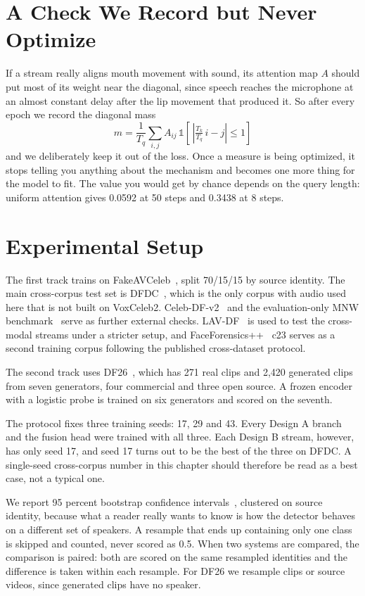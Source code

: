 \section{A Check We Record but Never Optimize}

If a stream really aligns mouth movement with sound, its attention map $A$
should put most of its weight near the diagonal, since speech reaches the
microphone at an almost constant delay after the lip movement that produced it.
So after every epoch we record the diagonal mass
\begin{equation}
m = \frac{1}{T_q}\sum_{i,j} A_{ij}\,\mathbb{1}\!\left[\,\left|\tfrac{T_k}{T_q}\,i - j\right| \le 1\right]
\end{equation}
and we deliberately keep it out of the loss. Once a measure is being optimized,
it stops telling you anything about the mechanism and becomes one more thing
for the model to fit. The value you would get by chance depends on the query
length: uniform attention gives 0.0592 at 50 steps and 0.3438 at 8 steps.

\section{Experimental Setup}

The first track trains on FakeAVCeleb~\cite{fakeavceleb}, split 70/15/15 by
source identity. The main cross-corpus test set is DFDC~\cite{dfdc}, which is
the only corpus with audio used here that is not built on VoxCeleb2.
Celeb-DF-v2~\cite{celebdf} and the evaluation-only MNW benchmark~\cite{mnw}
serve as further external checks. LAV-DF~\cite{lavdf} is used to test the
cross-modal streams under a stricter setup, and FaceForensics++~\cite{ffpp}
c23 serves as a second training corpus following the published cross-dataset
protocol.

The second track uses DF26~\cite{df26}, which has 271 real clips and 2,420
generated clips from seven generators, four commercial and three open source.
A frozen encoder with a logistic probe is trained on six generators and scored
on the seventh.

The protocol fixes three training seeds: 17, 29 and 43. Every Design A branch
and the fusion head were trained with all three. Each Design B stream, however,
has only seed 17, and seed 17 turns out to be the best of the three on DFDC. A
single-seed cross-corpus number in this chapter should therefore be read as a
best case, not a typical one.

We report 95 percent bootstrap confidence intervals~\cite{bootstrap},
clustered on source identity, because what a reader really wants to know is
how the detector behaves on a different set of speakers. A resample that ends
up containing only one class is skipped and counted, never scored as 0.5. When
two systems are compared, the comparison is paired: both are scored on the
same resampled identities and the difference is taken within each resample.
For DF26 we resample clips or source videos, since generated clips have no
speaker.

